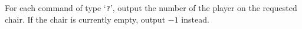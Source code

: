 
  For each command of type `\texttt{?}', output the number of the player on the requested chair.
  If the chair is currently empty, output $-1$ instead.
